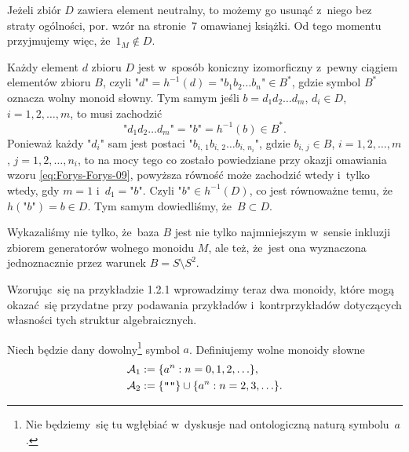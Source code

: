 \documentclass[a4paper,11pt]{article}
\begin{document}
Jeżeli zbiór $D$ zawiera element neutralny, to możemy go usunąć
z~niego bez straty ogólności, por. wzór na stronie~7 omawianej
książki. Od tego momentu przyjmujemy więc, że~$1_{ M } \notin D$.

Każdy element $d$ zbioru $D$ jest w~sposób koniczny izomorficzny
z~pewny ciągiem elementów zbioru $B$, czyli
$\texttt{"} d \texttt{"} = h^{ -1 }( d ) = \texttt{"} b_{ 1 } b_{ 2 }
\ldots b_{ n } \texttt{"} \in B^{ * }$, gdzie symbol $B^{ * }$ oznacza
wolny monoid słowny. Tym samym jeśli
$b = d_{ 1 } d_{ 2 } \ldots d_{ m }$, $d_{ i } \in D$,
$i = 1, 2, \ldots, m$, to musi zachodzić
\begin{equation}
  \label{eq:Forys-Forys-34}
  \texttt{"} d_{ 1 } d_{ 2 } \ldots d_{ m } \texttt{"} =
  \texttt{"} b \texttt{"} = h^{ -1 }( b ) \in B^{ * }.
\end{equation}
Ponieważ każdy $\texttt{"} d_{ i } \texttt{"}$ sam jest postaci
$\texttt{"} b_{ i,\, 1 } b_{ i,\, 2 } \ldots b_{ i,\, n_{ i } }
\texttt{"}$, gdzie $b_{ i,\, j } \in B$, $i = 1, 2, \ldots, m$,
$j = 1, 2, \ldots, n_{ i }$, to na mocy tego co zostało powiedziane przy
okazji omawiania wzoru \eqref{eq:Forys-Forys-09}, powyższa równość
może zachodzić wtedy i~tylko wtedy, gdy $m = 1$
i~$d_{ 1 } = \texttt{"} b \texttt{"}$. Czyli
$\texttt{"} b \texttt{"} \in h^{ -1 }( D )$, co jest równoważne temu,
że~$h( \texttt{"} b \texttt{"} ) = b \in D$. Tym samym dowiedliśmy,
że~$B \subset D$.

Wykazaliśmy nie tylko, że~baza $B$ jest nie tylko najmniejszym
w~sensie inkluzji zbiorem generatorów wolnego monoidu $M$, ale też,
że~jest ona wyznaczona jednoznacznie przez warunek $B = S \setminus S^{ 2 }$.

\vspace{\spaceFour}





 Wzorując~się na przykładzie 1.2.1 wprowadzimy teraz dwa monoidy,
które mogą okazać~się przydatne przy podawania przykładów i~kontrprzykładów
dotyczących własności tych struktur algebraicznych.

Niech będzie dany dowolny\footnote{Nie będziemy~się tu wgłębiać
  w~dyskusje nad ontologiczną naturą symbolu~$a$.} symbol $a$.
Definiujemy wolne monoidy słowne
\begin{subequations}
  \begin{align}
    \label{eq:Forys-Forys-35-A}
    \mathcal{A}_{ 1 } &:= \{ a^{ n } : n = 0, 1, 2, \ldots \}, \\
    \label{eq:Forys-Forys-35-B}
    \mathcal{A}_{ 2 } &:= \{ \texttt{""} \} \cup \{ a^{ n } : n = 2, 3, \ldots \}.
  \end{align}
\end{subequations}
\end{document}
